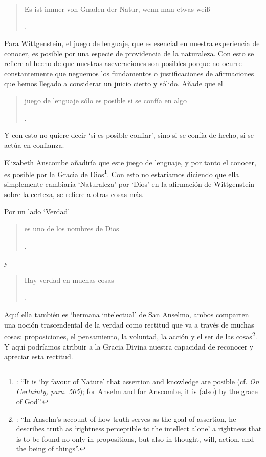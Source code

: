 \blockquote[{\Cite[\S505]{wittgenstein1969oncertes}}.]{Es ist immer von Gnaden der Natur, wenn man etwas weiß}. Para Wittgenstein, el juego de lenguaje, que es esencial en nuestra experiencia de conocer, es posible por una especie de providencia de la naturaleza. Con esto se refiere al hecho de que nuestras aseveraciones son posibles porque no ocurre constantemente que neguemos los fundamentos o justificaciones de afirmaciones que hemos llegado a considerar un juicio cierto y sólido. Añade que el \blockquote[{\Cite[\S509]{wittgenstein1969oncertes}}.]{juego de lenguaje sólo es posible si se confía en algo}. Y con esto no quiere decir \enquote*{si es posible confiar}, sino si se confía de hecho, si se actúa en confianza.

Elizabeth Anscombe añadiría que este juego de lenguaje, y por tanto el conocer, es posible por la Gracia de Dios\footnote{\Cite[Cf.][224]{teichmann2008ans}: \enquote{It is `by favour of Nature' that assertion and knowledge are posible (cf. \emph{On Certainty, para. 505}); for Anselm and for Anscombe, it is (also) by the grace of God}.}. Con esto no estaríamos diciendo que ella simplemente cambiaría `Naturaleza' por `Dios' en la afirmación de Wittgenstein sobre la certeza, se refiere a otras cosas más.

Por un lado `Verdad' \blockquote[{\Cite[47]{torralbaynubiola2005fayeh:verdad}}.]{es uno de los nombres de Dios} y \blockquote[{\Cite[47]{torralbaynubiola2005fayeh:verdad}}.]{Hay verdad en muchas cosas}. Aquí ella también es `hermana intelectual' de San Anselmo, ambos comparten una noción trascendental de la verdad como rectitud que va a través de muchas cosas: proposiciones, el pensamiento, la voluntad, la acción y el ser de las cosas\footnote{\Cite[Cf.][197]{teichmann2008ans}: \enquote{In Anselm's account of how truth serves as the goal of assertion, he describes truth as `rightness perceptible to the intellect alone' \textelp{} a rightness that is to be found no only in propositions, but also in thought, will, action, and the being of things}.}. Y aquí podríamos atribuir a la Gracia Divina nuestra capacidad de reconocer y apreciar esta rectitud.

